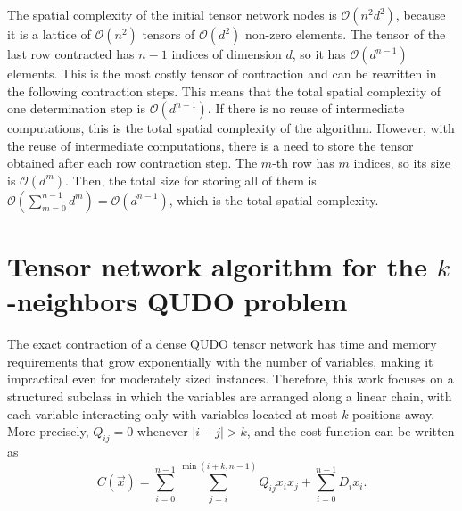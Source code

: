 \documentclass[%
 reprint,
 amsmath,amssymb,
 aps,
 pra,showkeys,
]{revtex4-2}
\begin{document}
The spatial complexity of the initial tensor network nodes is $\mathcal{O}\left(n^2d^2\right)$, because it is a lattice of $\mathcal{O}(n^2)$ tensors of $\mathcal{O}(d^2)$ non-zero elements. The tensor of the last row contracted has $n-1$ indices of dimension $d$, so it has $\mathcal{O}(d^{n-1})$ elements. This is the most costly tensor of contraction and can be rewritten in the following contraction steps. This means that the total spatial complexity of one determination step is $\mathcal{O}\left(d^{n-1}\right)$. If there is no reuse of intermediate computations, this is the total spatial complexity of the algorithm. However, with the reuse of intermediate computations, there is a need to store the tensor obtained after each row contraction step. The $m$-th row has $m$ indices, so its size is $\mathcal{O}(d^m)$. Then, the total size for storing all of them is $\mathcal{O}\left(\sum_{m=0}^{n-1} d^m\right)=\mathcal{O}\left(d^{n-1}\right)$, which is the total spatial complexity.


\section{Tensor network algorithm for the $k$-neighbors QUDO problem}\label{sec: kneigh qudo}
The exact contraction of a dense QUDO tensor network has time and
memory requirements that grow exponentially with the number of
variables, making it impractical even for moderately sized instances.
Therefore, this work focuses on a structured subclass in which the variables are arranged along a linear chain, with each variable interacting only with variables located at most \(k\) positions away. More precisely,
$Q_{ij}=0$ whenever $|i-j|>k$, and the cost function can be written as
\begin{equation}
C(\vec{x}) =
\sum_{i=0}^{n-1}
\sum_{j=i}^{\min(i+k,n-1)}
Q_{ij}x_i x_j
+
\sum_{i=0}^{n-1}D_i x_i .
\end{equation}
\end{document}
